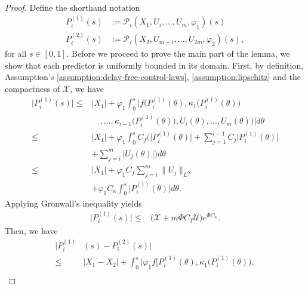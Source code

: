 \documentclass[letterpaper, 10 pt, conference]{ieeeconf}  %
\begin{document}
\begin{proof}
Define the shorthand notation
\begin{align}
    P_i^{(1)}(s) &:= \mathcal{P}_i(X_1,U_i,\dots,U_m, \varphi_1)(s) \\
    P_i^{(2)}(s) &:= \mathcal{P}_i(X_2,U_{m+i},\dots,U_{2m}, \varphi_2)(s),
\end{align}
for all $s \in [0,1]$. Before we proceed to prove the main part of the lemma, we show that each predictor is uniformly bounded in its domain. First, by definition, Assumption's \ref{assumption:delay-free-control-laws}, \ref{assumption:lipschitz} and the compactness of $\mathcal{X}$, we have
\begin{align}
    \bigg| P_i^{(1)}(s) \bigg| \leq& |X_1| + \varphi_1 \int_{0}^s \bigg| f \bigg( P_i^{(1)}(\theta), \kappa_1 \bigg( P_i^{(1)}(\theta) \bigg)\nonumber \\ 
    &\quad , \dots, \kappa_{i-1} \bigg( P_i^{(1)}(\theta) \bigg), U_i(\theta), \dots, U_m(\theta) \bigg) \bigg| d\theta \nonumber \\
        \leq& |X_1| + \varphi_1 \int_{0}^s C_f \Biggl( \bigg| P_i^{(1)}(\theta) \bigg| + \sum_{j=1}^{i-1} C_j \bigg| P_i^{(1)}(\theta) \bigg| \nonumber \\ & + \sum_{j=i}^m \bigg| U_j(\theta) \bigg| \Biggr) d\theta \nonumber \\
        \leq& |X_1| + \varphi_1 C_f \sum_{j=i}^m \| U_j \|_{L^\infty} \nonumber \\ & + \varphi_1 C_{\kappa} \int_{0}^s \bigg| P_i^{(1)}(\theta) \bigg| d\theta.
\end{align}
Applying Gronwall's inequality yields
\begin{align}
    \bigg| P_i^{(1)}(s) \bigg| \leq& \bigg( \overline{\mathcal{X}} + m \overline{\Phi} C_f \overline{\mathcal{U}} \bigg) e^{\overline{\Phi} C_{\kappa}}.
\end{align}
Then, we have
\begin{align}
    \bigg| P_i^{(1)}&(s) - P_i^{(2)}(s) \bigg| \nonumber \\ 
        \leq& |X_1 - X_2|  + \int_{0}^s \bigg| \varphi_1 f \bigg[ P_i^{(1)}(\theta), \kappa_1 \bigg( P_i^{(1)}(\theta) \bigg),\nonumber \\ 

\end{align}
\end{proof}
\end{document}
